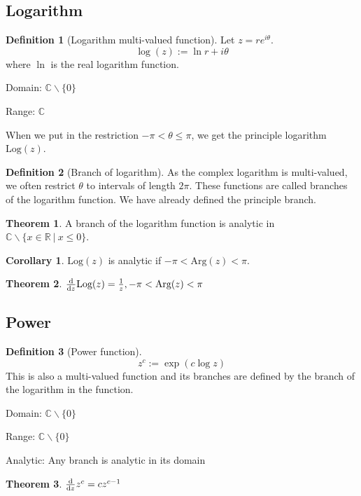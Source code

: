 \documentclass[10pt, a4paper]{extarticle}
\theoremstyle{definition}
\newtheorem{thm}{Theorem}
\newtheorem{cor}{Corollary}[thm]
\newtheorem{defn}{Definition}
\begin{document}
\subsection{Logarithm}
\begin{defn}[Logarithm multi-valued function]
	Let $z=re^{i\theta}$.
	\[\log(z):=\ln r+i\theta\]
	where $\ln$ is the real logarithm function.

	Domain: $\mathbb{C}\backslash\{0\}$

	Range: $\mathbb{C}$

	When we put in the restriction $-\pi<\theta\leq\pi$, we get the principle logarithm $\text{Log}(z)$.

\end{defn}
\begin{defn}[Branch of logarithm]
	As the complex logarithm is multi-valued, we often restrict $\theta$ to intervals of length $2\pi$. These functions are called branches of the logarithm function. We have already defined the principle branch.
\end{defn}

\begin{thm}
	A branch of the logarithm function is analytic in $\mathbb{C}\backslash\{x\in\mathbb{R}\ |\ x\leq 0\}$.
\end{thm}
\begin{cor}
	$\text{Log}(z)$ is analytic if $-\pi<\text{Arg}(z)<\pi$.
\end{cor}

\begin{thm}\label{logderivative}
	$\dv{}{z}\text{Log}(z)=\frac{1}{z},-\pi<\text{Arg}(z)<\pi$
\end{thm}

\subsection{Power}
\begin{defn}[Power function]
	\[z^c:=\exp(c\log z)\]
	This is also a multi-valued function and its branches are defined by the branch of the logarithm in the function.

	Domain: $\mathbb{C}\backslash\{0\}$

	Range: $\mathbb{C}\backslash\{0\}$

	Analytic: Any branch is analytic in its domain
\end{defn}
\begin{thm}
	$\dv{}{z}z^c=cz^{c-1}$
\end{thm}
\end{document}
